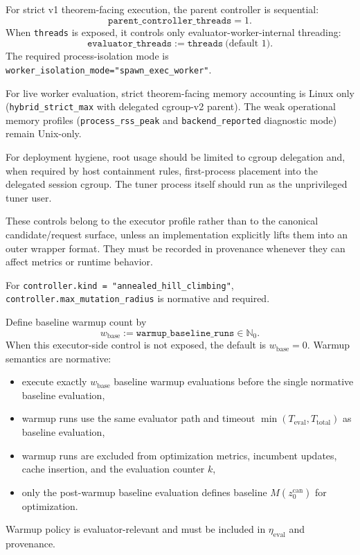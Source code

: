\documentclass[11pt]{article}
\begin{document}
For strict v1 theorem-facing execution, the parent controller is sequential:
\[
\texttt{parent\_controller\_threads}=1.
\]
When \texttt{threads} is exposed, it controls only evaluator-worker-internal
threading:
\[
\texttt{evaluator\_threads}:=\texttt{threads}\ \text{(default 1)}.
\]
The required process-isolation mode is
\texttt{worker\_isolation\_mode="spawn\_exec\_worker"}.

For live worker evaluation, strict theorem-facing memory accounting is Linux
only (\texttt{hybrid\_strict\_max} with delegated cgroup-v2 parent). The weak
operational memory profiles (\texttt{process\_rss\_peak} and
\texttt{backend\_reported} diagnostic mode) remain Unix-only.

For deployment hygiene, root usage should be limited to cgroup delegation and,
when required by host containment rules, first-process placement into the
delegated session cgroup. The tuner process itself should run as the
unprivileged tuner user.

These controls belong to the executor profile rather than to the canonical
candidate/request surface, unless an implementation explicitly lifts them into
an outer wrapper format. They must be recorded in provenance whenever they can
affect metrics or runtime behavior.

For \texttt{controller.kind = "annealed\_hill\_climbing"},
\texttt{controller.max\_mutation\_radius} is normative and required.

Define baseline warmup count by
\[
w_{\mathrm{base}}:=\texttt{warmup\_baseline\_runs}\in\mathbb{N}_0.
\]
When this executor-side control is not exposed, the default is
$w_{\mathrm{base}}=0$.
Warmup semantics are normative:
\begin{itemize}
    \item execute exactly $w_{\mathrm{base}}$ baseline warmup evaluations before
    the single normative baseline evaluation,
    \item warmup runs use the same evaluator path and timeout
    $\min(T_{\mathrm{eval}},T_{\mathrm{total}})$ as baseline evaluation,
    \item warmup runs are excluded from optimization metrics, incumbent updates,
    cache insertion, and the evaluation counter $k$,
    \item only the post-warmup baseline evaluation defines baseline
    $M(z_0^{\mathrm{can}})$ for optimization.
\end{itemize}
Warmup policy is evaluator-relevant and must be included in
$\eta_{\mathrm{eval}}$ and provenance.
\end{document}
